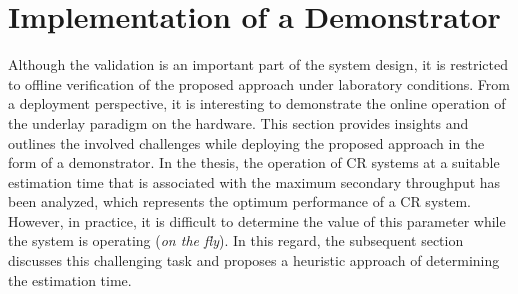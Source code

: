 \section{Implementation of a Demonstrator}
\label{sec:demo}
Although the validation is an important part of the system design, it is restricted to offline verification of the proposed approach under laboratory conditions. From a deployment perspective, it is interesting to demonstrate the online operation of the underlay paradigm on the hardware. This section provides insights and outlines the involved challenges while deploying the proposed approach in the form of a demonstrator. In the thesis, the operation of CR systems at a suitable estimation time that is associated with the maximum secondary throughput has been analyzed, which represents the optimum performance of a CR system. However, in practice, it is difficult to determine the value of this parameter while the system is operating (\textit{on the fly}). In this regard, the subsequent section discusses this challenging task and proposes a heuristic approach of determining the estimation time. 

